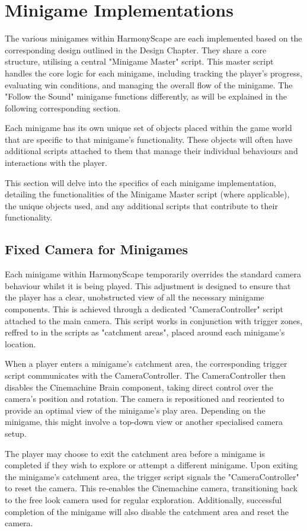 \documentclass{l4proj}
\begin{document}
\section{Minigame Implementations}
The various minigames within HarmonyScape are each implemented based on the corresponding design outlined in the Design Chapter. They share a core structure, utilising a central "Minigame Master" script. This master script handles the core logic for each minigame, including tracking the player's progress, evaluating win conditions, and managing the overall flow of the minigame. The "Follow the Sound" minigame functions differently, as will be explained in the following corresponding section. 

Each minigame has its own unique set of objects placed within the game world that are specific to that minigame's functionality. These objects will often have additional scripts attached to them that manage their individual behaviours and interactions with the player.

This section will delve into the specifics of each minigame implementation, detailing the functionalities of the Minigame Master script (where applicable), the unique objects used, and any additional scripts that contribute to their functionality.

\subsection{Fixed Camera for Minigames}
Each minigame within HarmonyScape temporarily overrides the standard camera behaviour whilst it is being played. This adjustment is designed to ensure that the player has a clear, unobstructed view of all the necessary minigame components. This is achieved through a dedicated "CameraController" script attached to the main camera. This script works in conjunction with trigger zones, reffred to in the scripts as "catchment areas", placed around each minigame's location.

When a player enters a minigame's catchment area, the corresponding trigger script communicates with the CameraController. The CameraController then disables the Cinemachine Brain component, taking direct control over the camera's position and rotation. The camera is repositioned and reoriented to provide an optimal view of the minigame's play area. Depending on the minigame, this might involve a top-down view or another specialised camera setup.

The player may choose to exit the catchment area before a minigame is completed if they wish to explore or attempt a different minigame. Upon exiting the minigame's catchment area, the trigger script signals the "CameraController" to reset the camera. This re-enables the Cinemachine camera, transitioning back to the free look camera used for regular exploration. Additionally, successful completion of the minigame will also disable the catchment area and reset the camera.
\end{document}
